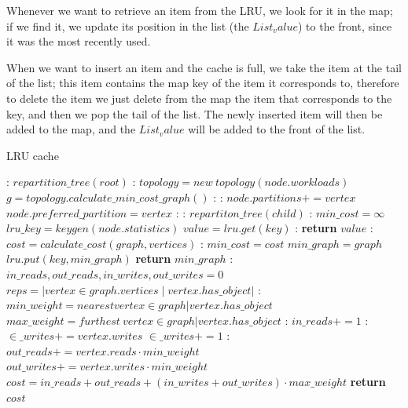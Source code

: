 Whenever we want to retrieve an item from the LRU, we look for it in the map; if we find it, we update its position in the list (the $List_value$) to the front, since it was the most recently used.

When we want to insert an item and the cache is full, we take the item at the tail of the list; this item contains the map key of the item it corresponds to, therefore to delete the item we just delete from the map the item that corresponds to the key, and then we pop the tail of the list. 
The newly inserted item will then be added to the map, and the $List_value$ will be added to the front of the list.


\begin{algorithm}
  \caption{LRU cache}\label{alg:lru}
  \begin{algorithmic}[1]
    :
  \State $repartition\_tree(root)$
  \EndFunction
  :
      \State $topology = new\ topology(node.workloads)$
      \State $g = topology.calculate\_min\_cost\_graph()$
      :
        :
        \State $node.partitions += vertex$
            \State $node.preferred\_partition = vertex$
          \EndIf
        \EndIf
      \EndFor
    \EndIf
    :
      :
        \State $repartiton\_tree(child)$
        \EndFor
    \EndIf
    \EndFunction
    :
    \State $min\_cost = \infty$
    \State $lru\_key = keygen(node.statistics)$
    \State $value = lru.get(key)$
    :
      \State \textbf{return} $value$
    \EndIf
      :
        \State $cost = calculate\_cost(graph, vertices)$
        :
          \State $min\_cost = cost$
          \State $min\_graph = graph$
        \EndIf
      \EndFor
    \State $lru.put(key, min\_graph)$
    \State \textbf{return} $min\_graph$
    \EndFunction
    :
      \State $in\_reads, out\_reads, in\_writes, out\_writes = 0$
      \State $reps = |vertex \in graph.vertices \mid vertex.has\_object|$
      :
      \State $min\_weight = nearest vertex \in graph | vertex.has\_object$
      \State $max\_weight = furthest\ vertex \in graph | vertex.has\_object$
        :
          \State $in\_reads+= 1$
          :
          \State $\in\_writes+= vertex.writes$
          \Else
          \State  $\in\_writes+= 1 $
          \EndIf
        \Else:
          \State $out\_reads += vertex.reads \cdot min\_weight$
          \State $out\_writes += vertex.writes \cdot min\_weight$
        \EndIf
      \EndFor
      \State $cost = in\_reads+ out\_reads + (in\_writes+ out\_writes) \cdot max\_weight$
      \State \textbf{return} $cost$
  \EndFunction
  \end{algorithmic}
  \end{algorithm}

